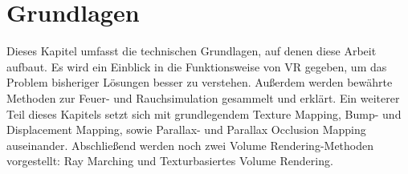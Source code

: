 \section{Grundlagen}
\label{sec:3}
Dieses Kapitel umfasst die technischen Grundlagen, auf denen diese Arbeit aufbaut. 
Es wird ein Einblick in die Funktionsweise von VR gegeben, um das Problem bisheriger Lösungen 
besser zu verstehen. Außerdem werden bewährte Methoden zur Feuer- und Rauchsimulation
gesammelt und erklärt. Ein weiterer Teil dieses Kapitels setzt sich mit grundlegendem Texture Mapping,
Bump- und Displacement Mapping, sowie Parallax- und Parallax Occlusion Mapping auseinander. Abschließend 
werden noch zwei Volume Rendering-Methoden vorgestellt: Ray Marching und Texturbasiertes Volume Rendering.







\newpage

